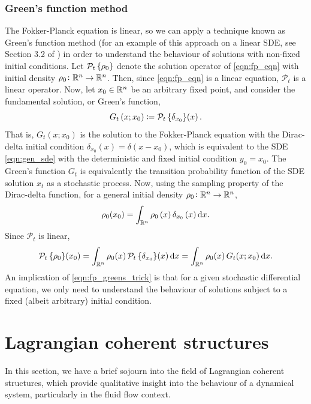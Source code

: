 \subsubsection{Green's function method}
The Fokker-Planck equation is linear, so we can apply a technique known as Green's function method (for an example of this approach on a linear SDE, see Section 3.2 of \citet{Risken_2012_FokkerPlanckEquationMethods}) in order to understand the behaviour of solutions with non-fixed initial conditions.
Let \(\mathcal{P}_t\set{\rho_0}\) denote the solution operator of \cref{eqn:fp_eqn} with initial density \(\rho_0\colon \mathbb{R}^n \to \mathbb{R}^n\).
Then, since \cref{eqn:fp_eqn} is a linear equation, \(\mathcal{P}_t\) is a linear operator.
Now, let \(x_0 \in \mathbb{R}^n\) be an arbitrary fixed point, and consider the fundamental solution, or Green's function,
\[
	G_t\left(x; x_0\right) \coloneqq \mathcal{P}_t\set{\delta_{x_0}}\!\left(x\right).
\]
That is, \(G_t\left(x; x_0\right)\) is the solution to the Fokker-Planck equation with the Dirac-delta initial condition \(\delta_{x_0}(x) = \delta\left(x - x_0\right)\), which is equivalent to the SDE \cref{eqn:gen_sde} with the deterministic and fixed initial condition \(y_0 = x_0\).
The Green's function \(G_t\) is equivalently the transition probability function of the SDE solution \(x_t\) as a stochastic process.
Now, using the sampling property of the Dirac-delta function, for a general initial density \(\rho_0\colon \mathbb{R}^n \to \mathbb{R}^n\),
\[
	\rho_0(x_0) = \int_{\R^n}{\rho_0\left(x\right)\delta_{x_0}\left(x\right)\dif x}.
\]
Since \(\mathcal{P}_t\) is linear,
\begin{equation}
	\mathcal{P}_t\set{\rho_0}\!\left(x_0\right) = \int_{\R^n}{\rho_0\!\left(x\right)\mathcal{P}_t\set{\delta_{x_0}}\!\left(x\right)\dif x} = \int_{\R^n}{\rho_0\!\left(x\right) G_t\!\left(x; x_0\right)\dif x}.
	\label{eqn:fp_greens_trick}
\end{equation}
An implication of \cref{eqn:fp_greens_trick} is that for a given stochastic differential equation, we only need to understand the behaviour of solutions subject to a fixed (albeit arbitrary) initial condition.


\section{Lagrangian coherent structures}\label{sec:bkg_lcs}
In this section, we have a brief sojourn into the field of Lagrangian coherent structures, which provide qualitative insight into the behaviour of a dynamical system, particularly in the fluid flow context.

